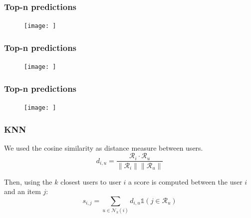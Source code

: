 \documentclass{beamer}
\begin{document}
%
%
%

\begin{frame}

\frametitle{Top-n predictions}

\begin{figure}[t]
\centering
\texttt{[image: ]}

\end{figure}


\end{frame}



%
%
%

\begin{frame}

\frametitle{Top-n predictions}

\begin{figure}[t]
\centering
\texttt{[image: ]}

\end{figure}


\end{frame}


%
%
%

\begin{frame}

\frametitle{Top-n predictions}

\begin{figure}[t]
\centering
\texttt{[image: ]}

\end{figure}


\end{frame}










%
%

\begin{frame}

\frametitle{KNN}
We used the cosine similarity as distance measure between users.
$$
d_{i,u} = \frac{ \mathcal{R}_i \cdot \mathcal{R}_u} {\|{\mathcal{R}_i} \|        \| {\mathcal{R}_u}   \|}
$$

Then, using the $k$ closest users to user $i$ a score is computed between the user $i$ and an item $j$:\\ 
$$
s_{i,j} = \sum_{u \in \mathcal{N}_k(i)} d_{i,u} \mathds{1}( j \in \mathcal{R}_u)
$$


\end{frame}


%
%
%
\end{document}
